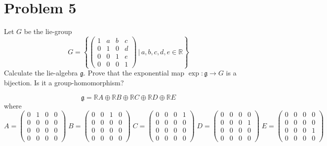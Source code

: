 \documentclass[12pt]{article}
\newcommand{\R}{\mathbb{R}}
\newcommand{\g}{\mathfrak{g}}
\begin{document}
    \color{black}


\pagebreak

\section*{Problem 5}
Let $G$ be the lie-group
\[G = \left\{\begin{pmatrix}
    1 & a & b & c \\
    0 & 1 & 0 & d \\
    0 & 0 & 1 & e \\
    0 & 0 & 0 & 1
\end{pmatrix} \, \bigg\vert \, a,b,c,d,e \in \R\right\}\]
Calculate the lie-algebra $\g$.  Prove that the exponential map $\exp : \g \longrightarrow G$ is a bijection. Is it a group-homomorphism?

    \color{blue}
        \[\g = \R A \oplus \R B \oplus \R C \oplus \R D \oplus \R E\]
        where 
        \[A = \begin{pmatrix}
            0 & 1 & 0 & 0 \\
            0 & 0 & 0 & 0 \\
            0 & 0 & 0 & 0 \\
            0 & 0 & 0 & 0
        \end{pmatrix}\; B = \begin{pmatrix}
            0 & 0 & 1 & 0 \\
            0 & 0 & 0 & 0 \\
            0 & 0 & 0 & 0 \\
            0 & 0 & 0 & 0
        \end{pmatrix}\; C = \begin{pmatrix}
            0 & 0 & 0 & 1 \\
            0 & 0 & 0 & 0 \\
            0 & 0 & 0 & 0 \\
            0 & 0 & 0 & 0
        \end{pmatrix}\; D = \begin{pmatrix}
            0 & 0 & 0 & 0 \\
            0 & 0 & 0 & 1 \\
            0 & 0 & 0 & 0 \\
            0 & 0 & 0 & 0
        \end{pmatrix}\; E = \begin{pmatrix}
            0 & 0 & 0 & 0 \\
            0 & 0 & 0 & 0 \\
            0 & 0 & 0 & 1 \\
            0 & 0 & 0 & 0
        \end{pmatrix}\]
\end{document}
